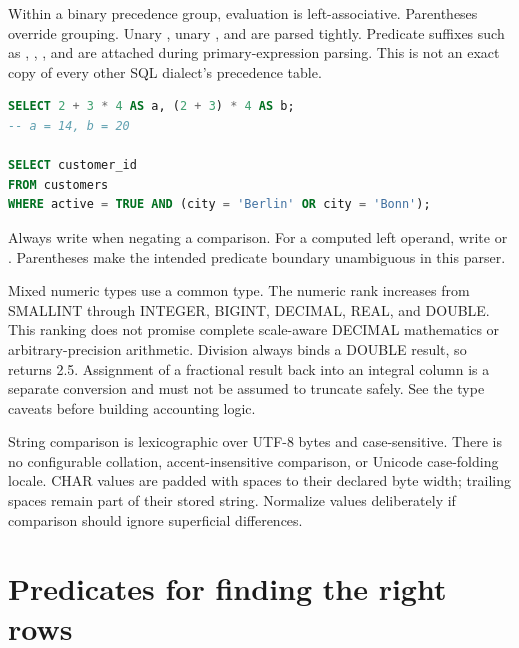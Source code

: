 Within a binary precedence group, evaluation is left-associative. Parentheses override grouping. Unary \code{+}, unary \code{-}, and  are parsed tightly. Predicate suffixes such as , , , and  are attached during primary-expression parsing. This is not an exact copy of every other SQL dialect's precedence table.

\begin{lstlisting}[language=SQL]
SELECT 2 + 3 * 4 AS a, (2 + 3) * 4 AS b;
-- a = 14, b = 20

SELECT customer_id
FROM customers
WHERE active = TRUE AND (city = 'Berlin' OR city = 'Bonn');
\end{lstlisting}

Always write  when negating a comparison. For a computed left operand, write  or . Parentheses make the intended predicate boundary unambiguous in this parser.

Mixed numeric types use a common type. The numeric rank increases from SMALLINT through INTEGER, BIGINT, DECIMAL, REAL, and DOUBLE. This ranking does not promise complete scale-aware DECIMAL mathematics or arbitrary-precision arithmetic. Division always binds a DOUBLE result, so  returns 2.5. Assignment of a fractional result back into an integral column is a separate conversion and must not be assumed to truncate safely. See the type caveats before building accounting logic.

String comparison is lexicographic over UTF-8 bytes and case-sensitive. There is no configurable collation, accent-insensitive comparison, or Unicode case-folding locale. CHAR values are padded with spaces to their declared byte width; trailing spaces remain part of their stored string. Normalize values deliberately if comparison should ignore superficial differences.


\section{Predicates for finding the right rows}

